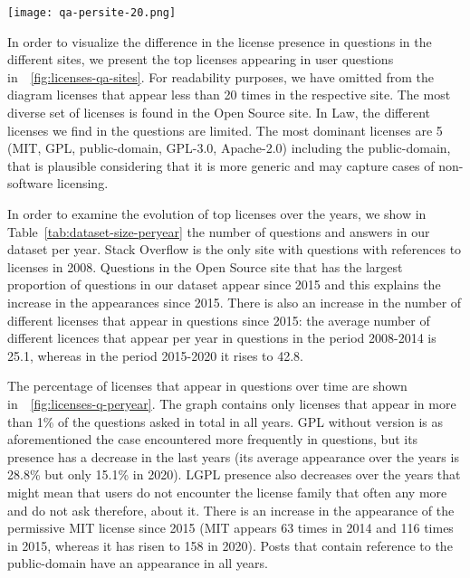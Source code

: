 \documentclass{elsarticle}
\begin{document}
\begin{figure*}[!t]
\centering
\texttt{[image: qa-persite-20.png]}
\caption{Licenses asked about per Stack Exchange site.}
\label{fig:licenses-qa-sites}
\end{figure*}

In order to visualize the difference in the license presence in questions in the different sites, we present the top licenses appearing in user questions
in~\figurename~\ref{fig:licenses-qa-sites}. For readability purposes, we have omitted from the diagram licenses that appear less than 20 times in the respective site. The most diverse set of licenses is found in the Open Source site. In Law, the different licenses we find in the questions are limited. The most dominant licenses are 5 (MIT, GPL, public-domain, GPL-3.0, Apache-2.0) including the public-domain, that is plausible considering that it is more generic and may capture cases of non-software licensing. 

In order to examine the evolution of top licenses over the years, we show in Table~\ref{tab:dataset-size-peryear} the number of questions and answers in our dataset per year. Stack Overflow is the only site with questions with references to licenses in 2008. Questions in the Open Source site that has the largest proportion of questions in our dataset appear since 2015 and this explains the increase in the appearances since 2015. There is also an increase in the number of different licenses that appear in questions since 2015: the average number of different licences that appear per year in questions in the period 2008-2014 is 25.1, whereas in the period 2015-2020 it rises to 42.8.

The percentage of licenses that appear in questions over time are shown in~\figurename~\ref{fig:licenses-q-peryear}. The graph contains only licenses that appear in more than 1\% of the questions asked in total in all years. GPL without version is as aforementioned the case encountered more frequently in questions, but its presence has a decrease in the last years (its average appearance over the years is 28.8\% but only 15.1\% in 2020). LGPL presence also decreases over the years that might mean that users do not encounter the license family that often any more and do not ask therefore, about it. There is an increase in the appearance of the permissive MIT license since 2015 (MIT appears 63 times in 2014 and 116 times in 2015, whereas it has risen to 158 in 2020). Posts that contain reference to the public-domain have an appearance in all years.
\end{document}
